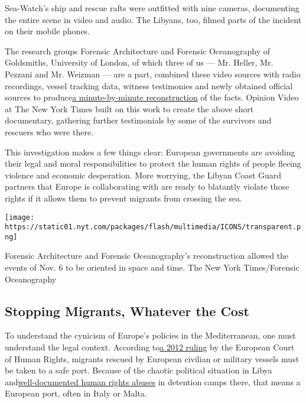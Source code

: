 Sea-Watch's ship and rescue rafts were outfitted with nine cameras,
documenting the entire scene in video and audio. The Libyans, too,
filmed parts of the incident on their mobile phones.

The research groups Forensic Architecture and Forensic Oceanography of
Goldsmiths, University of London, of which three of us --- Mr. Heller,
Mr. Pezzani and Mr. Weizman --- are a part, combined these video sources
with radio recordings, vessel tracking data, witness testimonies and
newly obtained official sources to
produce\href{https://www.forensic-architecture.org/case/sea-watch/}{}\href{https://www.forensic-architecture.org/case/sea-watch/}{a
minute-by-minute reconstruction} of the facts. Opinion Video at The New
York Times built on this work to create the above short documentary,
gathering further testimonials by some of the survivors and rescuers who
were there.

This investigation makes a few things clear: European governments are
avoiding their legal and moral responsibilities to protect the human
rights of people fleeing violence and economic desperation. More
worrying, the Libyan Coast Guard partners that Europe is collaborating
with are ready to blatantly violate those rights if it allows them to
prevent migrants from crossing the sea.

\texttt{[image: https://static01.nyt.com/packages/flash/multimedia/ICONS/transparent.png]}

Forensic Architecture and Forensic Oceanography's reconstruction allowed
the events of Nov. 6 to be oriented in space and time. The New York
Times/Forensic Oceanography

\hypertarget{stopping-migrants-whatever-the-cost}{%
\subsection{Stopping Migrants, Whatever the
Cost}\label{stopping-migrants-whatever-the-cost}}

To understand the cynicism of Europe's policies in the Mediterranean,
one must understand the legal context. According
to\href{https://www.amnesty.org/en/latest/news/2012/02/italy-historic-european-court-judgment-upholds-migrants-rights/}{}\href{https://www.amnesty.org/en/latest/news/2012/02/italy-historic-european-court-judgment-upholds-migrants-rights/}{a
2012 ruling} by the European Court of Human Rights, migrants rescued by
European civilian or military vessels must be taken to a safe port.
Because of the chaotic political situation in Libya
and\href{https://www.amnesty.org/en/latest/news/2018/05/libya-shameful-eu-policies-fuel-surge-in-detention-of-migrants-and-refugees/}{}\href{https://www.amnesty.org/en/latest/news/2018/05/libya-shameful-eu-policies-fuel-surge-in-detention-of-migrants-and-refugees/}{well-documented
human rights abuses} in detention camps there, that means a European
port, often in Italy or Malta.

